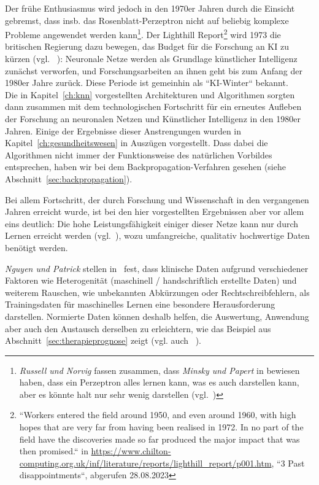 Der frühe Enthusiasmus wird jedoch in den 1970er Jahren durch die Einsicht gebremst, dass {insb.} das Rosenblatt-Perzeptron nicht auf beliebig komplexe Probleme angewendet werden kann\footnote{
    \textit{Russell und Norvig} fassen zusammen, dass \textit{Minsky und Papert} in \cite{MP88} bewiesen haben, dass ein Perzeptron alles lernen kann, was es auch darstellen kann, aber es könnte halt nur sehr wenig darstellen (vgl.~\cite[45]{RN09})
}.
Der Lighthill Report\footnote{
    ``Workers entered the field around 1950, and even around 1960, with high hopes that are very far from having been realised in 1972. In no part of the field have the discoveries made so far produced the major impact that was then promised.`` in \url{https://www.chilton-computing.org.uk/inf/literature/reports/lighthill\_report/p001.htm}, ``3 Past disappointments``, abgerufen 28.08.2023
} wird 1973 die britischen Regierung dazu bewegen, das Budget für die Forschung an KI zu kürzen (vgl. ~\cite[45]{RN09}): Neuronale Netze werden als Grundlage künstlicher Intelligenz zunächst verworfen, und Forschungsarbeiten an ihnen geht bis zum Anfang der 1980er Jahre zurück.
Diese Periode ist gemeinhin als ``KI-Winter`` bekannt.\\

Die in Kapitel~\ref{ch:knn} vorgestellten Architekturen und Algorithmen sorgten dann zusammen mit dem technologischen Fortschritt für ein erneutes Aufleben der Forschung an neuronalen Netzen und Künstlicher Intelligenz in den 1980er Jahren.
Einige der Ergebnisse dieser Anstrengungen wurden in Kapitel~\ref{ch:gesundheitswesen} in Auszügen vorgestellt.
Dass dabei die Algorithmen nicht immer der Funktionsweise des natürlichen Vorbildes entsprechen, haben wir bei dem Backpropagation-Verfahren gesehen (siehe Abschnitt~\ref{sec:backpropagation}).

Bei allem Fortschritt, der durch Forschung und Wissenschaft in den vergangenen Jahren erreicht wurde, ist bei den hier vorgestellten Ergebnissen aber vor allem eins deutlich: Die hohe Leistungsfähigkeit einiger dieser Netze kann nur durch Lernen erreicht werden (vgl.~\cite[40]{AHR19}), wozu umfangreiche, qualitativ hochwertige Daten benötigt werden.

\textit{Nguyen und Patrick} stellen in~\cite{NP16} fest, dass klinische Daten aufgrund verschiedener Faktoren wie Heterogenität (maschinell / handschriftlich erstellte Daten) und weiterem Rauschen, wie unbekannten Abkürzungen oder Rechtschreibfehlern, als Trainingsdaten für maschinelles Lernen eine besondere Herausforderung darstellen.
Normierte Daten können deshalb helfen, die Auswertung, Anwendung aber auch den Austausch derselben zu erleichtern, wie das Beispiel aus Abschnitt~\ref{sec:therapieprognose} zeigt (vgl. auch ~\cite[42]{AHR19}).

